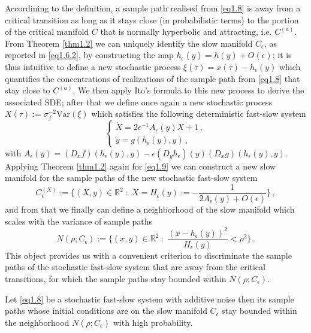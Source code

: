 \documentclass[../main.tex]{subfiles}
\begin{document}
Accordining to the definition, a sample path realised from \eqref{eq1.8} is away from a critical transition as long as it stays close (in probabilistic terms) to the portion of the critical manifold $C$ that is normally hyperbolic and attracting, i.e. $C^{(a)}$.
From Theorem \ref{thm1.2} we can uniquely identify the slow manifold $C_{\epsilon}$, as reported in \eqref{eq1.6.2}, by constructing the map $h_{\epsilon}(y)=h(y) + O(\epsilon)$; it is thus intuitive to define a new stochastic process $\xi(\tau)=x(\tau)-h_{\epsilon}(y)$ which quantifies the concentrations of realizations of the sample path from \eqref{eq1.8} that stay close to $C^{(a)}$. We then apply Ito's formula to this new process to derive the associated SDE; after that we define once again a new stochastic process $X(\tau):=\sigma_f^{-2} \text{Var}(\xi)$ which satisfies the following deterministic fast-slow system
\begin{equation}\label{eq1.9}
   \begin{cases}
      \dot{X} = 2\epsilon^{-1}A_{\epsilon}(y)X +1 \,, \\
      \dot{y} = g(h_{\epsilon}(y),y) \,, 
   \end{cases}
\end{equation}
with $A_{\epsilon}(y)=(D_x f)(h_{\epsilon}(y),y) - \epsilon (D_y h_{\epsilon})(y) (D_x g)(h_{\epsilon}(y),y)$. Applying Theorem \ref{thm1.2} again for \eqref{eq1.9} we can construct a new slow manifold for the sample paths of the new stochastic fast-slow system
\begin{equation}\label{eq1.10}
        C_{\epsilon}^{(X)}:=\{(X,y)\in \mathbb{R}^2\;:\;X=H_{\epsilon}(y):=- \frac{1}{2A_{\epsilon}(y)+O(\epsilon)}\}\,,
\end{equation}
and from that we finally can define a neighborhood of the slow manifold which scales with the variance of sample paths
\begin{equation}\label{eq1.11}
        N(\rho;C_{\epsilon}):=\{(x,y)\in \mathbb{R}^{2}\;:\;\frac{(x-h_{\epsilon}(y))^{2}}{H_{\epsilon}(y)}<\rho^2\}\,.
\end{equation}
This object provides us with a convenient criterion to discriminate the sample paths of the stochastic fast-slow system that are away from the critical transitions, for which the sample paths stay bounded within $N(\rho;C_{\epsilon})$.
\begin{theorem}[label=thm1.3]{}{}
    Let \eqref{eq1.8} be a stochastic fast-slow system with additive noise then its sample paths whose initial conditions are on the slow manifold $C_{\epsilon}$ stay bounded within the neighborhood $N(\rho;C_{\epsilon})$ with high probability. 
\end{theorem}
\end{document}
